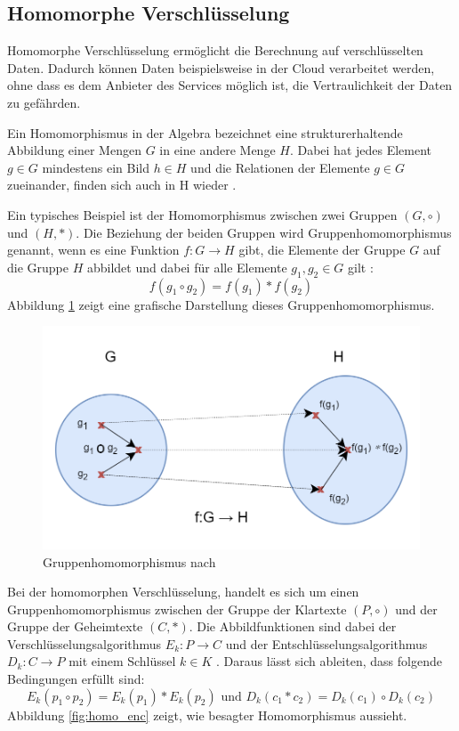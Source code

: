 \subsection{Homomorphe Verschlüsselung}

Homomorphe Verschlüsselung ermöglicht die Berechnung auf verschlüsselten Daten. Dadurch können Daten beispielsweise in der Cloud verarbeitet werden, ohne dass es dem Anbieter des Services möglich ist, die Vertraulichkeit der Daten zu gefährden.

Ein Homomorphismus in der Algebra bezeichnet eine strukturerhaltende Abbildung einer Mengen $G$ in eine andere Menge $H$.
Dabei hat jedes Element $g \in G $ mindestens ein Bild $h \in H$ und die Relationen der Elemente $g \in G$ zueinander, finden sich auch in H wieder \cite{B-2}.

Ein typisches Beispiel ist der Homomorphismus zwischen zwei Gruppen $(G,\circ)$ und $(H,\ast)$. 
Die Beziehung der beiden Gruppen wird Gruppenhomomorphismus genannt, wenn es eine Funktion $f:G\to H$ gibt, die Elemente der Gruppe $G$ auf die Gruppe $H$ abbildet und dabei für alle Elemente $g_1,g_2 \in G$ gilt \cite{P-98}:
\begin{equation*}
    f(g_1 \circ g_2) = f(g_1) \ast f(g_2)
\end{equation*}
Abbildung \ref{fig:group_homomorphismus} zeigt eine grafische Darstellung dieses Gruppenhomomorphismus.

\begin{figure}[!htb]
    \centering
    \includegraphics[width=12cm]{figures/group_homomophismus.png}
    \caption{Gruppenhomomorphismus nach \cite{P-98}}
    \label{fig:group_homomorphismus}
\end{figure} 

Bei der homomorphen Verschlüsselung, handelt es sich um einen Gruppenhomomorphismus zwischen der Gruppe der Klartexte $(P,\circ)$ und der Gruppe der Geheimtexte $(C,\ast)$. 
Die Abbildfunktionen sind dabei der Verschlüsselungsalgorithmus $E_k:P\to C$ und der Entschlüsselungsalgorithmus $D_k:C\to P$ mit einem Schlüssel $k \in K$ \cite{P-98}. 
Daraus lässt sich ableiten, dass folgende Bedingungen erfüllt sind:
\begin{equation*}
    E_k(p_1 \circ p_2) = E_k(p_1) \ast E_k(p_2)  \text{ und } D_k(c_1 \ast c_2) = D_k(c_1) \circ D_k(c_2)
\end{equation*}
Abbildung \ref{fig:homo_enc} zeigt, wie besagter Homomorphismus aussieht.

